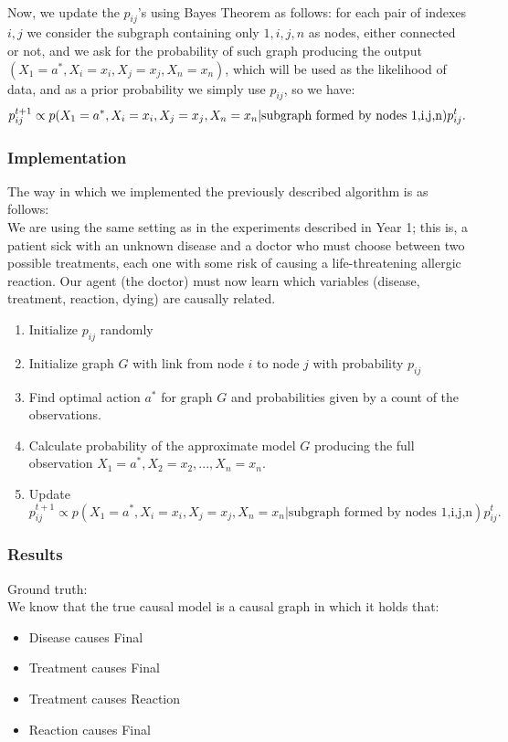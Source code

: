 \documentclass[english,letterpaper,12pt,final]{article}
\theoremstyle{definition}
\begin{document}
\\
Now, we update the $p_{ij}$'s using Bayes Theorem as follows: for each pair of indexes $i,j$ we consider the subgraph containing only $1,i,j,n$ as nodes, either connected or not, and we ask for the probability of such graph producing the output $(X_1 = a^\ast, X_i = x_i, X_j=x_j, X_n=x_n)$, which will be used as the likelihood of data, and as a prior probability we simply use $p_{ij}$, so we have:
\begin{equation}{\label{bayesian_updating}}
p_{ij}^{t+1} \propto p(X_1 = a^\ast, X_i = x_i, X_j=x_j, X_n=x_n | \textrm{subgraph formed by nodes 1,i,j,n})p_{ij}^t.
\end{equation}

\subsubsection{Implementation}
The way in which we implemented the previously described algorithm is as follows:\\
We are using the same setting as in the experiments described in Year 1; this is, a patient sick with an unknown disease and a doctor who must choose between two possible treatments, each one with some risk of causing a life-threatening allergic reaction. Our agent (the doctor) must now learn which variables (disease, treatment, reaction, dying) are causally related.\\
\begin{enumerate}
\item Initialize $p_{ij}$ randomly
\item Initialize graph $G$ with link from node $i$ to node $j$ with probability $p_{ij}$
\item Find optimal action $a^\ast$ for graph $G$ and probabilities given by a count of the observations.
\item Calculate probability of the approximate model $G$ producing the full observation $X_1 = a^\ast, X_2=x_2,...,X_n=x_n$. 
\item Update $p_{ij}^{t+1} \propto p(X_1 = a^\ast, X_i = x_i, X_j=x_j, X_n=x_n | \textrm{subgraph formed by nodes 1,i,j,n})p_{ij}^t.$
\end{enumerate}
\subsubsection{Results}
Ground truth:\\
We know that the true causal model is a causal graph in which it holds that:
\begin{itemize}
\item Disease causes Final
\item Treatment causes Final
\item Treatment causes Reaction
\item Reaction causes Final
\end{itemize}
\end{document}

